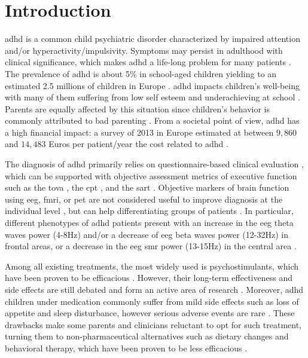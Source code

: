 

\section{Introduction} 

\gls{adhd} is a common child psychiatric disorder characterized by impaired attention and/or hyperactivity/impulsivity.
Symptoms may persist in adulthood with clinical significance, which makes \gls{adhd} a life-long problem for many
patients \citep{Faraone2006}. The prevalence of \gls{adhd} is about 5\% in school-aged children yielding to an estimated
2.5 millions of children in Europe \citep{DSM-5}. \gls{adhd} impacts children's well-being with many of them suffering
from low self esteem \citep{Shaw2005} and underachieving at school \citep{Barry2002}. Parents are equally affected by this
situation since children's behavior is commonly attributed to bad parenting \citep{Harpin2005}. From a societal point
of view, \gls{adhd} has a high financial impact: a survey of 2013 in Europe estimated at between $9,860$ and 
$14,483$ Euros per patient/year the cost related to \gls{adhd} \citep{le2014}. 
 
The diagnosis of \gls{adhd} primarily relies on questionnaire-based clinical evaluation \citep{DSM-5}, which can be
supported with objective assessment metrics of executive function such as the \gls{tova} \citep{Forbes1998}, the
\gls{cpt} \citep{Barkley1991}, and the \gls{sart} \citep{Robertson1997}. Objective markers of brain function
using \gls{eeg}, \gls{fmri}, or \gls{pet} are not considered useful to improve diagnosis at the individual
level \citep{Neba}, but can help differentiating groups of patients \citep{Johnstone2005}.  
In particular, different phenotypes of \gls{adhd} patients present with an increase in the \gls{eeg} theta waves 
power (4-8Hz) and/or a decrease of \gls{eeg} beta waves power (12-32Hz) in frontal areas, or a decrease in the \gls{eeg} 
\gls{smr} power (13-15Hz) in the central area \citep{Monastra2005, Matouvsek1984, Janzen1995, loo2017}.  
 
Among all existing treatments, the most widely used is psychostimulants, which have been proven to be efficacious
\citep{Taylor2014, Storebo2015}. However, their long-term effectiveness and side effects are still debated and form 
an active area of research \citep{DuPaul1998, Swanson2001, Jensen1999}. Moreover, \gls{adhd} children under medication 
commonly suffer from mild side effects such as loss of appetite and sleep disturbance, however serious adverse events
are rare \citep{Storebo2015, Cooper2011}. These drawbacks make some parents and clinicians reluctant to 
opt for such treatment, turning them to non-pharmaceutical alternatives such as dietary changes \citep{Belanger2009} and behavioral 
therapy, which have been proven to be less efficacious \citep{Sonuga-Barke2013}.

